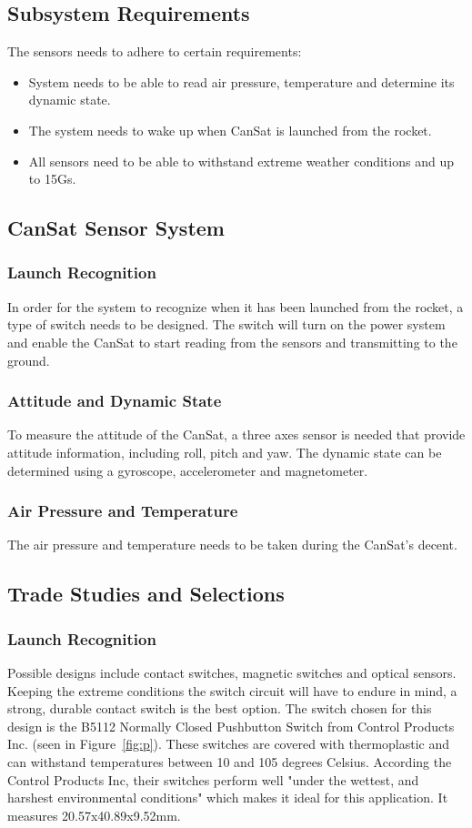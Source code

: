 \documentclass[10pt, a4paper]{article}
\begin{document}
\subsection{Subsystem Requirements}
The sensors needs to adhere to certain requirements:
\begin{itemize}
    \item System needs to be able to read air pressure, temperature and determine its dynamic state.
    \item The system needs to wake up when CanSat is launched from the rocket.
    \item All sensors need to be able to withstand extreme weather conditions and up to 15Gs.
\end{itemize}
\subsection{CanSat Sensor System}
\subsubsection{Launch Recognition}
In order for the system to recognize when it has been launched from the rocket, a type of switch needs to be designed.   The switch will turn on the power system and enable the CanSat to start reading from the sensors and transmitting to the ground.
\subsubsection{Attitude and Dynamic State}
To measure the attitude of the CanSat, a three axes sensor is needed that provide attitude information, including roll, pitch and yaw.  The dynamic state can be determined using a gyroscope, accelerometer and magnetometer. 
\subsubsection{Air Pressure and Temperature}
The air pressure and temperature needs to be taken during the CanSat's decent.  
\subsection{Trade Studies and Selections}
\subsubsection{Launch Recognition}
Possible designs include contact switches, magnetic switches and optical sensors.  Keeping the extreme conditions the switch circuit will have to endure in mind, a strong, durable contact switch is the best option.  The switch chosen for this design is the B5112 Normally Closed Pushbutton Switch from Control Products Inc. (seen in Figure~\ref{fig:p}). These switches are covered with thermoplastic and can withstand temperatures between 10 and 105 degrees Celsius.  According the Control Products Inc, their switches perform well "under the wettest, and harshest environmental conditions" which makes it ideal for this application.  It measures 20.57x40.89x9.52mm.
\end{document}
